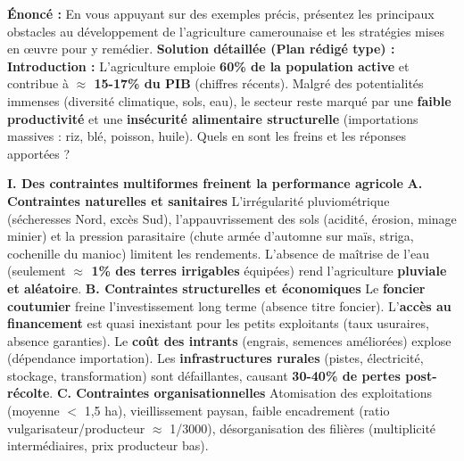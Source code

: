 \documentclass[11pt]{article}
\begin{document}
\begin{exoresolu}
\textbf{Énoncé :} En vous appuyant sur des exemples précis, présentez les principaux obstacles au développement de l'agriculture camerounaise et les stratégies mises en œuvre pour y remédier.
\tcblower
\textbf{Solution détaillée (Plan rédigé type) :}
\textbf{Introduction :}
L'agriculture emploie \textbf{60\% de la population active} et contribue à \textbf{$\approx$ 15-17\% du PIB} (chiffres récents). Malgré des potentialités immenses (diversité climatique, sols, eau), le secteur reste marqué par une \textbf{faible productivité} et une \textbf{insécurité alimentaire structurelle} (importations massives : riz, blé, poisson, huile). Quels en sont les freins et les réponses apportées ?

\textbf{I. Des contraintes multiformes freinent la performance agricole}
\textbf{A. Contraintes naturelles et sanitaires}
L'irrégularité pluviométrique (sécheresses Nord, excès Sud), l'appauvrissement des sols (acidité, érosion, minage minier) et la pression parasitaire (chute armée d'automne sur maïs, striga, cochenille du manioc) limitent les rendements. L'absence de maîtrise de l'eau (seulement \textbf{$\approx$ 1\% des terres irrigables} équipées) rend l'agriculture \textbf{pluviale et aléatoire}.
\textbf{B. Contraintes structurelles et économiques}
Le \textbf{foncier coutumier} freine l'investissement long terme (absence titre foncier). L'\textbf{accès au financement} est quasi inexistant pour les petits exploitants (taux usuraires, absence garanties). Le \textbf{coût des intrants} (engrais, semences améliorées) explose (dépendance importation). Les \textbf{infrastructures rurales} (pistes, électricité, stockage, transformation) sont défaillantes, causant \textbf{30-40\% de pertes post-récolte}.
\textbf{C. Contraintes organisationnelles}
Atomisation des exploitations (moyenne $<$ 1,5 ha), vieillissement paysan, faible encadrement (ratio vulgarisateur/producteur $\approx$ 1/3000), désorganisation des filières (multiplicité intermédiaires, prix producteur bas).


\end{exoresolu}
\end{document}
